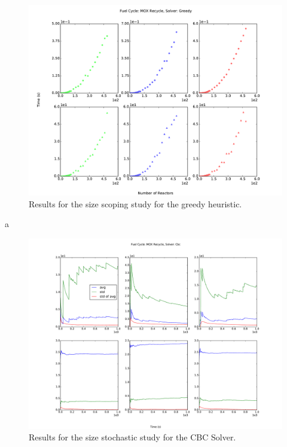 \documentclass{anstrans}
\begin{document}
\begin{figure}
  \begin{center}
    \includegraphics[width=2\columnwidth]{base_back_n_rxtr_time_fc1_solvergreedy.pdf}
    \caption[]{
      \label{fig:greedy_size}
      Results for the size scoping study for the greedy heuristic.
      }
  \end{center}
\end{figure}

a

\begin{figure}
  \begin{center}
    \includegraphics[width=2\columnwidth]{1k_avg_front_time_fc1_solvercbc.pdf}
    \caption[]{
      \label{fig:cbc_size}
      Results for the size stochastic study for the CBC Solver.
      }
  \end{center}
\end{figure}
\end{document}

